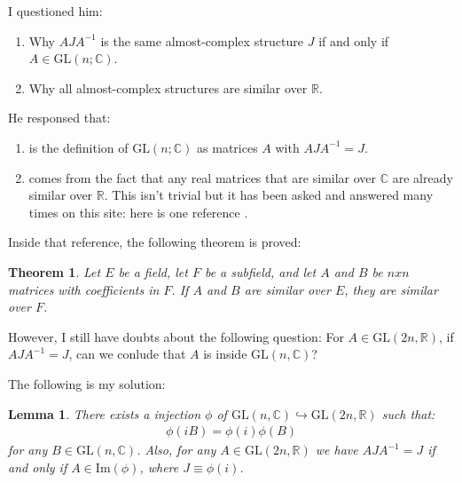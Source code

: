 \documentclass{article}
\numberwithin{equation}{subsection} %
\newtheorem{thm}{Theorem}[section]
\newtheorem{lemma}{Lemma}[section]
\theoremstyle{definition}
\begin{document}
        I questioned him:
        \begin{enumerate}
            \item Why $AJA^{-1}$ is the same almost-complex structure 
                $J$ if and only if $A\in \mathrm{GL}(n;\mathbb{C})$. 
            \item Why all almost-complex structures are similar over 
                $\mathbb{R}$.
        \end{enumerate}
        He responsed that:
        \begin{enumerate}
            \item is the definition of $\mathrm{GL}(n;\mathbb{C})$
                as matrices $A$ with $AJA^{-1}=J$.
            \item comes from the fact that any real matrices that are 
                similar over $\mathbb{C}$ are already similar over 
                $\mathbb{R}$. This isn't trivial but it has been asked 
                and answered many times on this site: here is one 
                reference \cite{math.se_4}.
        \end{enumerate}

        Inside that reference, the following theorem is proved:

        \begin{thm}
            Let $E$ be a field, let $F$ be a subfield, and let $A$ and
            $B$ be $nxn$ matrices with coefficients in $F$. If $A$ and
            $B$ are similar over $E$, they are similar over $F$.
        \end{thm}

        However, I still have doubts about the following question:
        For $A\in \mathrm{GL}(2n,\mathbb{R})$, if $AJA^{-1}=J$, can we
        conlude that $A$ is inside $\mathrm{GL}(n,\mathbb{C})$?

        The following is my solution:
        \begin{lemma}
            There exists a injection $\phi$ of $\mathrm{GL}(n,\mathbb{C})
            \hookrightarrow \mathrm{GL}(2n,\mathbb{R})$ such that:
            \begin{align}
                \phi(i B)= \phi(i)\phi(B)
            \end{align}
            for any $B\in \mathrm{GL}(n,\mathbb{C})$. Also, for any
            $A\in \mathrm{GL}(2n,\mathbb{R})$ we have $AJA^{-1}=J$
            if and only if $A\in \mathrm{Im}(\phi)$, where $J\equiv\phi(i)$.
        \end{lemma}
        
\end{document}
